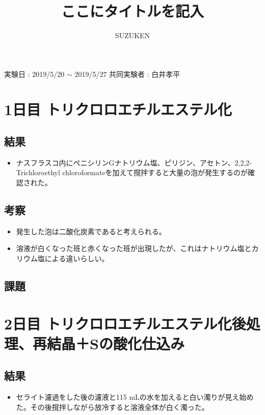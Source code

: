\documentclass[a4paper,papersize,dvipdfmx]{jsarticle}
\begin{document}
\title{ここにタイトルを記入}
\author{SUZUKEN}
\date{}
\maketitle



実験日 : 2019/5/20 $\sim$ 2019/5/27
共同実験者 : 白井孝平

\section*{1日目 トリクロロエチルエステル化}
\subsection*{結果}
\begin{itemize}
\item ナスフラスコ内にペニシリンGナトリウム塩、ピリジン、アセトン、2,2,2-Trichloroethyl chloroformateを加えて撹拌すると大量の泡が発生するのが確認された。


\end{itemize}
\subsection*{考察}
\begin{itemize}
\item 発生した泡は二酸化炭素であると考えられる。
\item 溶液が白くなった班と赤くなった班が出現したが、これはナトリウム塩とカリウム塩による違いらしい。

\end{itemize}
\subsection*{課題}


\section*{2日目 トリクロロエチルエステル化後処理、再結晶＋Sの酸化仕込み}
\subsection*{結果}
\begin{itemize}
\item セライト濾過をした後の濾液と115 mLの水を加えると白い濁りが見え始めた。その後撹拌しながら放冷すると溶液全体が白く濁った。

\end{itemize}
\end{document}
